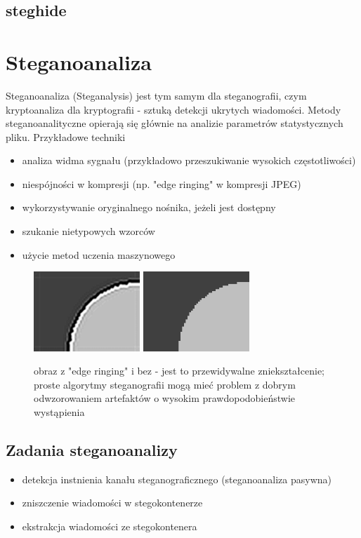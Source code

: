 \documentclass{article}
\begin{document}
\subsection{steghide}
\section{Steganoanaliza}
Steganoanaliza (Steganalysis) jest tym samym dla steganografii, czym kryptoanaliza dla kryptografii - sztuką detekcji ukrytych wiadomości.
Metody steganoanalityczne opierają się głównie na analizie parametrów statystycznych pliku. Przykładowe techniki
\begin{itemize}
	\item analiza widma sygnału (przykładowo przeszukiwanie wysokich częstotliwości)
	\item niespójności w kompresji (np. "edge ringing" w kompresji JPEG)
	\item wykorzystywanie oryginalnego nośnika, jeżeli jest dostępny 
	\item szukanie nietypowych wzorców 
	\item użycie metod uczenia maszynowego
\end{itemize}
\begin{figure}[H]
	\centering
	\includegraphics[width=4cm]{edge_ringing}
	\includegraphics[width=4cm]{noringing}
	\caption{obraz z "edge ringing" i bez - jest to przewidywalne zniekształcenie; proste algorytmy steganografii mogą mieć problem z dobrym 
	odwzorowaniem artefaktów o wysokim prawdopodobieństwie wystąpienia}
\end{figure}
\subsection{Zadania steganoanalizy}
\begin{itemize}
	\item detekcja instnienia kanału steganograficznego (steganoanaliza pasywna)
	\item zniszczenie wiadomości w stegokontenerze
	\item ekstrakcja wiadomości ze stegokontenera
\end{itemize}
\end{document}
